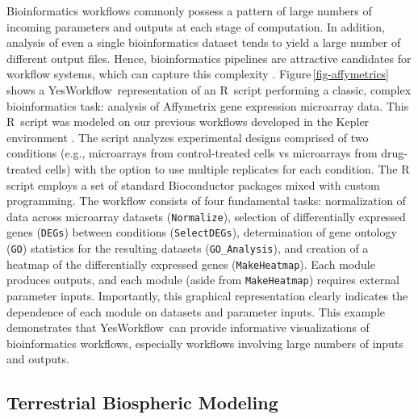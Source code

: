 \documentclass{article}
\newcommand{\YW}{\textsf{YesWorkflow}}
\newcommand{\ywm}[1]{\texttt{#1}}
\newcommand{\R}{\textsf{R}}
\newcommand{\figref}[1]{Figure\,\ref{#1}}
\begin{document}
 Bioinformatics workflows commonly possess a pattern of large numbers
 of incoming parameters and outputs at each stage of computation. In
 addition, analysis of even a single bioinformatics dataset tends to
 yield a large number of different output files. Hence, bioinformatics
 pipelines are attractive candidates for workflow systems, which can
 capture this complexity \cite{bieda2012kepler}. \figref{fig-affymetrics}
 shows a \YW\ representation of an \R\ script performing a
 classic, complex bioinformatics task: analysis of Affymetrix gene
 expression microarray data. This \R\ script was modeled on our previous
 workflows developed in the Kepler environment \cite{stropp2012workflows}.
 The script analyzes experimental designs comprised of two conditions 
 (e.g., microarrays from control-treated cells vs microarrays from drug-treated cells) 
 with the option to use multiple replicates for each condition. The R script employs 
 a set of standard Bioconductor 
 \cite{gentleman2004bioconductor} packages mixed with custom programming. The
 workflow consists of four fundamental tasks: normalization of data
 across microarray datasets (\ywm{Normalize}), selection of
 differentially expressed genes (\ywm{DEGs}) between conditions
 (\ywm{SelectDEGs}), determination of gene ontology (\ywm{GO})
 statistics for the resulting datasets (\ywm{GO\_Analysis}), and
 creation of a heatmap of the differentially expressed genes
 (\ywm{MakeHeatmap}). Each module produces outputs, and each module
 (aside from \ywm{MakeHeatmap}) requires external parameter
 inputs. Importantly, this graphical representation clearly indicates
 the dependence of each module on datasets and parameter inputs. This
 example demonstrates that \YW\ can provide informative visualizations
 of bioinformatics workflows, especially workflows involving large
 numbers of inputs and outputs.




\subsection{Terrestrial Biospheric Modeling}\label{sec-MsTMIP}
\end{document}
